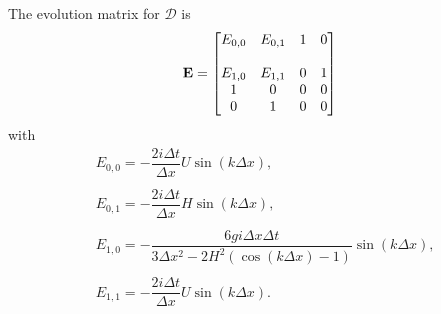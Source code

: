 The evolution matrix for $\mathcal{D}$ is 
 \begin{equation}
\label{eqn:AppEvolD}
\mathbf{E} = \begin{bmatrix}
{E}_{0,0} & {E}_{0,1}  & 1 &0 \\ \\
{E}_{1,0} & {E}_{1,1}  & 0 &1 \\
1  & 0  &0 &0 \\
0  & 1  &0 &0 
\end{bmatrix} 
\end{equation}
with
\begin{align*}
&{E}_{0,0} = -  \dfrac{2 i\Delta t }{\Delta x} U\sin\left(k \Delta x\right) , \\ \\
&{E}_{0,1} = -  \dfrac{2 i\Delta t}{\Delta x} H \sin\left(k \Delta x\right),\\ \\
& {E}_{1,0} =-\dfrac{6 gi \Delta x\Delta t}{3 \Delta x^2 -2{H^2} \left( \cos\left(k \Delta x\right) - 1 \right)}{ \sin\left(k \Delta x\right)}, \\\\
& {E}_{1,1} =-\dfrac{2i \Delta t }{\Delta x} U \sin\left(k \Delta x\right).
\end{align*}



